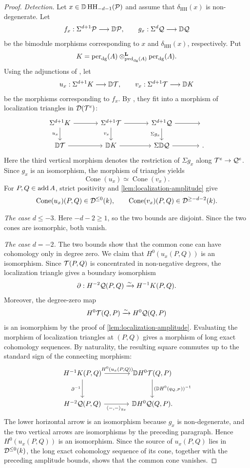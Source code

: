 \documentclass[11pt,a4paper,dvipsnames,x11names]{amsart}
\begin{document}
\begin{proof}
\emph{Detection.}
Let $x\in\mathbb D\operatorname{HH}_{-d-1}(\mathcal P)$ and assume that $\delta_{\mathrm{HH}}(x)$ is non-degenerate. Let
\[
    f_x:\Sigma^{d+1}\mathcal P\longrightarrow \mathbb D\mathcal P,
    \qquad
    g_x:\Sigma^d\mathcal Q\longrightarrow \mathbb D\mathcal Q
\]
be the bimodule morphisms corresponding to $x$ and $\delta_{\mathrm{HH}}(x)$, respectively. Put
\[
    K=\operatorname{per}_{\mathrm{dg}}(A)\otimes^{\mathbf L}_{\operatorname{pvd}_{\mathrm{dg}}(A)}\operatorname{per}_{\mathrm{dg}}(A).
\]
Using the adjunctions of \cite[Lemma~4.2.1]{HaniharaLiu26}, let
\[
    u_x:\Sigma^{d+1}K\longrightarrow\mathbb D\mathcal T,
    \qquad
    v_x:\Sigma^{d+1}\mathcal T\longrightarrow\mathbb D K
\]
be the morphisms corresponding to $f_x$. By \cite[Proposition~4.2.2 and Theorem~4.3.1(a)]{HaniharaLiu26}, they fit into a morphism of localization triangles in $\mathcal D(\mathcal T^e)$:
\[
\begin{tikzcd}[column sep=large]
\Sigma^{d+1}K \ar[r] \ar[d,"u_x"'] & \Sigma^{d+1}\Tdg \ar[r] \ar[d,"v_x"'] & \Sigma^{d+1}\Qdg \ar[r] \ar[d,"\Sigma g_x"'] & {} \\
\DD\Tdg \ar[r] & \DD K \ar[r] & \Sigma \DD\Qdg \ar[r] & {}.
\end{tikzcd}
\]
Here the third vertical morphism denotes the restriction of $\Sigma g_x$ along $\mathcal T^e\to\mathcal Q^e$. Since $g_x$ is an isomorphism, the morphism of triangles yields
\[
    \operatorname{Cone}(u_x)\simeq\operatorname{Cone}(v_x).
\]
For $P,Q\in\operatorname{add} A$, strict positivity and \cref{lem:localization-amplitude} give
\[
    \operatorname{Cone}(u_x)(P,Q)\in \mathcal D^{\leq0}(k),
    \qquad
    \operatorname{Cone}(v_x)(P,Q)\in \mathcal D^{\geq-d-2}(k).
\]

\emph{The case $d\leq-3$.}
Here $-d-2\geq1$, so the two bounds are disjoint. Since the two cones are isomorphic, both vanish.

\emph{The case $d=-2$.}
The two bounds show that the common cone can have cohomology only in degree zero. We claim that $H^0(u_x(P,Q))$ is an isomorphism. Since $\mathcal T(P,Q)$ is concentrated in non-negative degrees, the localization triangle gives a boundary isomorphism
\[
    \partial:H^{-2}\mathcal Q(P,Q)\xrightarrow{\sim}H^{-1}K(P,Q).
\]
Moreover, the degree-zero map
\[
    H^0\mathcal T(Q,P)\xrightarrow{\sim}H^0\mathcal Q(Q,P)
\]
is an isomorphism by the proof of \cref{lem:localization-amplitude}. Evaluating the morphism of localization triangles at $(P,Q)$ gives a morphism of long exact cohomology sequences. By naturality, the resulting square commutes up to the standard sign of the connecting morphism:
\[
\begin{tikzcd}[column sep=large,row sep=large]
H^{-1}K(P,Q) \ar[r,"{H^0(u_x(P,Q))}"] \ar[d,"\partial^{-1}"'] & \DD H^0\Tdg(Q,P) \ar[d,"{(\DD H^0(q_{Q,P}))^{-1}}"] \\
H^{-2}\Qdg(P,Q) \ar[r,"{\langle-,-\rangle_{g_x}}"'] & \DD H^0\Qdg(Q,P).
\end{tikzcd}
\]
The lower horizontal arrow is an isomorphism because $g_x$ is non-degenerate, and the two vertical arrows are isomorphisms by the preceding paragraph. Hence $H^0(u_x(P,Q))$ is an isomorphism. Since the source of $u_x(P,Q)$ lies in $\mathcal D^{\leq0}(k)$, the long exact cohomology sequence of its cone, together with the preceding amplitude bounds, shows that the common cone vanishes.


\end{proof}
\end{document}
